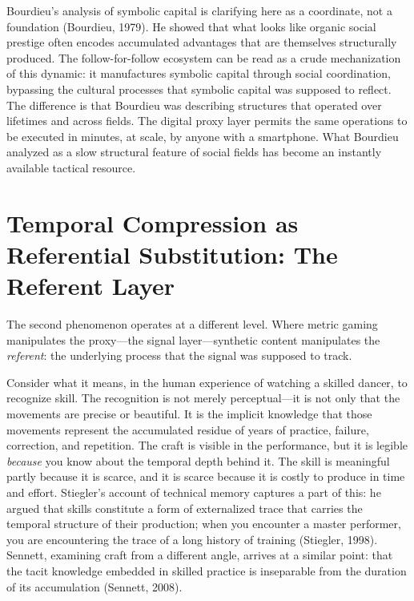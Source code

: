 \documentclass[12pt, a4paper]{article}
\begin{document}
Bourdieu's analysis of symbolic capital is clarifying here as a coordinate, not a foundation (Bourdieu, 1979). He showed that what looks like organic social prestige often encodes accumulated advantages that are themselves structurally produced. The follow-for-follow ecosystem can be read as a crude mechanization of this dynamic: it manufactures symbolic capital through social coordination, bypassing the cultural processes that symbolic capital was supposed to reflect. The difference is that Bourdieu was describing structures that operated over lifetimes and across fields. The digital proxy layer permits the same operations to be executed in minutes, at scale, by anyone with a smartphone. What Bourdieu analyzed as a slow structural feature of social fields has become an instantly available tactical resource.

\section{Temporal Compression as Referential Substitution: The Referent Layer}

The second phenomenon operates at a different level. Where metric gaming manipulates the proxy---the signal layer---synthetic content manipulates the \textit{referent}: the underlying process that the signal was supposed to track.

Consider what it means, in the human experience of watching a skilled dancer, to recognize skill. The recognition is not merely perceptual---it is not only that the movements are precise or beautiful. It is the implicit knowledge that those movements represent the accumulated residue of years of practice, failure, correction, and repetition. The craft is visible in the performance, but it is legible \textit{because} you know about the temporal depth behind it. The skill is meaningful partly because it is scarce, and it is scarce because it is costly to produce in time and effort. Stiegler's account of technical memory captures a part of this: he argued that skills constitute a form of externalized trace that carries the temporal structure of their production; when you encounter a master performer, you are encountering the trace of a long history of training (Stiegler, 1998). Sennett, examining craft from a different angle, arrives at a similar point: that the tacit knowledge embedded in skilled practice is inseparable from the duration of its accumulation (Sennett, 2008).
\end{document}
